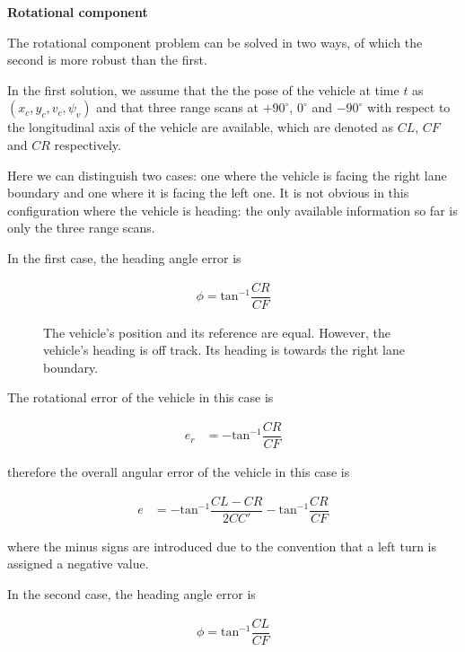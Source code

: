 \textbf{Rotational component}
\newline

The rotational component problem can be solved in two ways, of which the
second is more robust than the first.

In the first solution, we assume that the the pose of the vehicle at time $t$ as
$(x_c, y_c, v_c, \psi_v)$ and that three range scans
at $+90^\circ$, $0^\circ$ and $-90^\circ$ with respect to the
longitudinal axis of the vehicle are available, which are denoted as
$CL$, $CF$ and $CR$ respectively.

Here we can distinguish two cases: one where the vehicle is facing the right
lane boundary and one where it is facing the left one. It is not obvious
in this configuration where the vehicle is heading: the only available
information so far is only the three range scans.

In the first case, the heading angle error is

\begin{align}
  \phi = \text{tan}^{-1}\dfrac{CR}{CF}
\end{align}

\begin{figure}[H]\centering
  \scalebox{1}{}
  \caption{The vehicle's position and its reference are equal. However,
    the vehicle's heading is off track. Its heading is towards the right
    lane boundary.}
  \label{}
\end{figure}

The rotational error of the vehicle in this case is

\begin{align}
  e_r &= -\text{tan}^{-1}\dfrac{CR}{CF}
\end{align}

therefore the overall angular error of the vehicle in this case is

\begin{align}
  e &= -\text{tan}^{-1}\dfrac{CL-CR}{2CC'} - \text{tan}^{-1}\dfrac{CR}{CF}
\end{align}

where the minus signs are introduced due to the
convention that a left turn is assigned a negative value.


In the second case, the heading angle error is

\begin{align}
  \phi = \text{tan}^{-1}\dfrac{CL}{CF}
\end{align}

